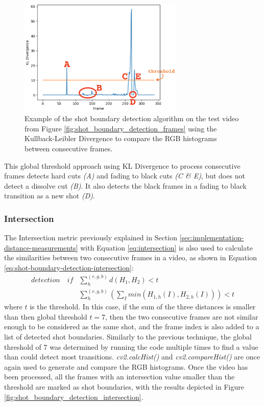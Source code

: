 \begin{figure}[h] 
\centerline{\includegraphics[width=0.70\textwidth]{figures/implementation/shot_boundary_detection_example.png}}
\caption{\label{fig:shot_boundary_detection_example}Example of the shot boundary detection algorithm on the test video from Figure    \ref{fig:shot_boundary_detection_frames} using the Kullback-Leibler Divergence to compare the RGB histograms between consecutive frames.}
\end{figure}

This global threshold approach using KL Divergence to process consecutive frames detects hard cuts \textit{(A)} and fading to black cuts \textit{(C \& E)}, but does not detect a dissolve cut \textit{(B)}. It also detects the black frames in a fading to black transition as a new shot \textit{(D)}.

\subsubsection{Intersection}

The Intersection metric previously explained in Section \ref{sec:implementation-distance-measurements} with Equation \ref{eq:intersection} is also used to calculate the similarities between two consecutive frames in a video, as shown in Equation \ref{eq:shot-boundary-detection-intersection}:
\begin{equation}
\label{eq:shot-boundary-detection-intersection}
\begin{aligned}
    detection \quad if & \sum_{h}^{(r,g,b)}d(H_1,H_2) < t \\
    & \sum_{h}^{(r,g,b)} (\sum_Imin(H_{1,h}(I),H_{2,h}(I))) < t
\end{aligned}
\end{equation}
where $t$ is the threshold. In this case, if the sum of the three distances is smaller than then global threshold $t=7$, then the two consecutive frames are not similar enough to be considered as the same shot, and the frame index is also added to a list of detected shot boundaries. Similarly to the previous technique, the global threshold of 7 was determined by running the code multiple times to find a value than could detect most transitions. \textit{cv2.calcHist()} and \textit{cv2.compareHist()} are once again used to generate and compare the RGB histograms. Once the video has been processed, all the frames with an intersection value smaller than the threshold are marked as shot boundaries, with the results depicted in Figure \ref{fig:shot_boundary_detection_intersection}.\\

